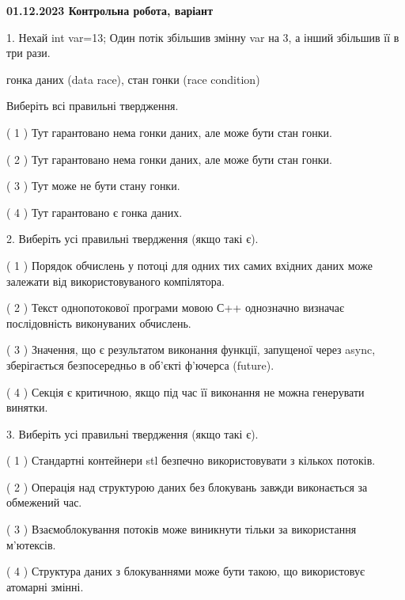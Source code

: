 \documentclass[12pt, ukrainian]{article}
\begin{document}
\vspace{4mm}
\newpage
\begin {large}

\textbf{01.12.2023 Контрольна робота, варіант  }\par


{
1. Нехай int var=13; Один потік збільшив змінну var на 3, а інший збільшив її в три рази.

гонка даних (data race), стан гонки (race condition)

Виберіть всі правильні твердження.\par
\vspace{2mm}
( 1 ) Тут гарантовано нема гонки даних, але може бути стан гонки.%

( 2 ) Тут гарантовано нема гонки даних, але може бути стан гонки.%

( 3 ) Тут може не бути стану гонки.%

( 4 ) Тут гарантовано є гонка даних.%


\vspace{5mm}
2. Виберіть усі правильні твердження (якщо такі є).\par
\vspace{2mm}

( 1 ) Порядок обчислень у потоці для одних тих самих вхідних даних може залежати від використовуваного компілятора.%

( 2 ) Текст однопотокової програми мовою С++ однозначно визначає послідовність виконуваних обчислень.%

( 3 ) Значення, що є результатом виконання функції, запущеної через async, зберігається безпосередньо в об’єкті ф’ючерса (future).%

( 4 ) Секція є критичною, якщо під час її виконання не можна генерувати винятки.%


\vspace{5mm}
3. Виберіть усі правильні твердження (якщо такі є).\par
\vspace{2mm}

( 1 ) Стандартні контейнери stl безпечно використовувати з кількох потоків.%

( 2 ) Операція над структурою даних без блокувань завжди виконається за обмежений час.%

( 3 ) Взаємоблокування потоків може виникнути тільки за використання м’ютексів.%

( 4 ) Структура даних з блокуваннями може бути такою, що використовує атомарні змінні.%


}
\end{large}
\end{document}
